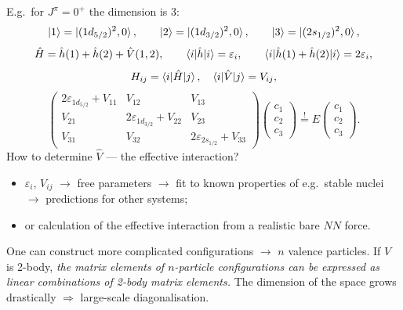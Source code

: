 \documentclass[11pt,a4paper]{article}
\newcommand{\op}[1]{\hat{#1}}
\begin{document}
E.g.\ for $J^\pi=0^+$ the dimension is 3:
\[
\ket1=\ket{(1d_{5/2})^2,0},\qquad \ket2=\ket{(1d_{3/2})^2,0},\qquad \ket3=\ket{(2s_{1/2})^2,0},
\]
\[
\op H=\op h(1)+\op h(2)+\op V(1,2),\qquad
\braket{i|\op h|i}=\varepsilon_i,\qquad \braket{i|\op h(1)+\op h(2)|i}=2\varepsilon_i,
\]
\[
H_{ij}=\braket{i|\op H|j},\quad \braket{i|\op V|j}=V_{ij},
\]
\[
\begin{pmatrix}
2\varepsilon_{1d_{5/2}}+V_{11} & V_{12} & V_{13}\\
V_{21} & 2\varepsilon_{1d_{3/2}}+V_{22} & V_{23}\\
V_{31} & V_{32} & 2\varepsilon_{2s_{1/2}}+V_{33}
\end{pmatrix}
\begin{pmatrix}c_1\\c_2\\c_3\end{pmatrix}
\overset{!}{=}E\begin{pmatrix}c_1\\c_2\\c_3\end{pmatrix}.
\]
How to determine $\op V$ --- the effective interaction?
\begin{itemize}
\item $\varepsilon_i$, $V_{ij}$ $\to$ free parameters $\to$ fit to known properties of e.g.\ stable nuclei $\to$ predictions for other systems;
\item or calculation of the effective interaction from a realistic bare $NN$ force.
\end{itemize}
One can construct more complicated configurations $\to$ $n$ valence particles. If $V$ is 2-body, \emph{the matrix elements of $n$-particle configurations can be expressed as linear combinations of 2-body matrix elements.} The dimension of the space grows drastically $\Rightarrow$ large-scale diagonalisation.
\end{document}
